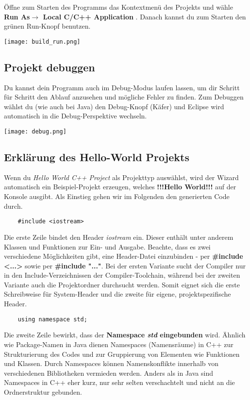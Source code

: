 Öffne zum Starten des Programms das Kontextmenü des Projekts und wähle \textbf{Run As$\rightarrow$ Local C/C++ Application }.
Danach kannst du zum Starten den grünen Run-Knopf benutzen.

\begin{center}
\texttt{[image: build\_run.png]}
\end{center}

\subsection{Projekt debuggen}
Du kannst dein Programm auch im Debug-Modus laufen lassen, um dir Schritt für Schritt den Ablauf anzusehen und mögliche Fehler zu finden.
Zum Debuggen wählst du (wie auch bei Java) den Debug-Knopf (\glqq Käfer\grqq) und Eclipse wird automatisch in die Debug-Perspektive wechseln.

\texttt{[image: debug.png]}

\subsection{Erklärung des Hello-World Projekts}
Wenn du \emph{Hello World C++ Project} als Projekttyp auswählst, wird der Wizard automatisch ein Beispiel-Projekt erzeugen, welches \textbf{!!!Hello World!!!} auf der Konsole ausgibt.
Als Einstieg gehen wir im Folgenden den generierten Code durch.

\begin{lstlisting}
	#include <iostream>
\end{lstlisting}

Die erste Zeile bindet den Header \emph{iostream} ein.
Dieser enthält unter anderem Klassen und Funktionen zur Ein- und Ausgabe.
Beachte, dass es zwei verschiedene Möglichkeiten gibt, eine Header-Datei einzubinden -  per \textbf{\#include <...>} sowie per \textbf{\#include "..."}. Bei der ersten Variante sucht der Compiler nur in den Include-Verzeichnissen der Compiler-Toolchain, während bei der zweiten Variante auch die Projektordner durchsucht werden. Somit eignet sich die erste Schreibweise für System-Header und die zweite für eigene, projektspezifische Header.

\begin{lstlisting}
	using namespace std;
\end{lstlisting}
Die zweite Zeile bewirkt, dass der \textbf{Namespace \emph{std} eingebunden} wird. Ähnlich wie Package-Namen in Java dienen Namespaces (Namensräume) in C++ zur Strukturierung des Codes und zur Gruppierung von Elementen wie Funktionen und Klassen.
Durch Namespaces können Namenskonflikte innerhalb von verschiedenen Bibliotheken vermieden werden.
Anders als in Java sind Namespaces in C++ eher kurz, nur sehr selten verschachtelt und nicht an die Ordnerstruktur gebunden.


